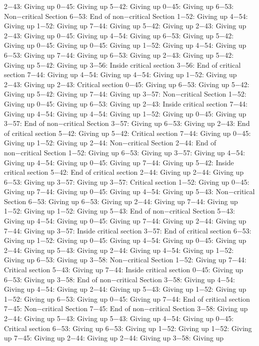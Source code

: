 2−43: Giving up
0−45: Giving up
5−42: Giving up
0−45: Giving up
6−53: Non−critical Section
6−53: End of non−critical Section
1−52: Giving up
4−54: Giving up
1−52: Giving up
7−44: Giving up
5−42: Giving up
2−43: Giving up
2−43: Giving up
0−45: Giving up
4−54: Giving up
6−53: Giving up
5−42: Giving up
0−45: Giving up
0−45: Giving up
1−52: Giving up
4−54: Giving up
6−53: Giving up
7−44: Giving up
6−53: Giving up
2−43: Giving up
5−42: Giving up
5−42: Giving up
3−56: Inside critical section
3−56: End of critical section
7−44: Giving up
4−54: Giving up
4−54: Giving up
1−52: Giving up
2−43: Giving up
2−43: Critical section
0−45: Giving up
6−53: Giving up
5−42: Giving up
5−42: Giving up
7−44: Giving up
3−57: Non−critical Section
1−52: Giving up
0−45: Giving up
6−53: Giving up
2−43: Inside critical section
7−44: Giving up
4−54: Giving up
4−54: Giving up
1−52: Giving up
0−45: Giving up
3−57: End of non−critical Section
3−57: Giving up
6−53: Giving up
2−43: End of critical section
5−42: Giving up
5−42: Critical section
7−44: Giving up
0−45: Giving up
1−52: Giving up
2−44: Non−critical Section
2−44: End of non−critical Section
1−52: Giving up
6−53: Giving up
3−57: Giving up
4−54: Giving up
4−54: Giving up
0−45: Giving up
7−44: Giving up
5−42: Inside critical section
5−42: End of critical section
2−44: Giving up
2−44: Giving up
6−53: Giving up
3−57: Giving up
3−57: Critical section
1−52: Giving up
0−45: Giving up
7−44: Giving up
0−45: Giving up
4−54: Giving up
5−43: Non−critical Section
6−53: Giving up
6−53: Giving up
2−44: Giving up
7−44: Giving up
1−52: Giving up
1−52: Giving up
5−43: End of non−critical Section
5−43: Giving up
4−54: Giving up
0−45: Giving up
7−44: Giving up
2−44: Giving up
7−44: Giving up
3−57: Inside critical section
3−57: End of critical section
6−53: Giving up
1−52: Giving up
0−45: Giving up
4−54: Giving up
0−45: Giving up
2−44: Giving up
5−43: Giving up
2−44: Giving up
4−54: Giving up
1−52: Giving up
6−53: Giving up
3−58: Non−critical Section
1−52: Giving up
7−44: Critical section
5−43: Giving up
7−44: Inside critical section
0−45: Giving up
6−53: Giving up
3−58: End of non−critical Section
3−58: Giving up
4−54: Giving up
4−54: Giving up
2−44: Giving up
5−43: Giving up
1−52: Giving up
1−52: Giving up
6−53: Giving up
0−45: Giving up
7−44: End of critical section
7−45: Non−critical Section
7−45: End of non−critical Section
3−58: Giving up
2−44: Giving up
5−43: Giving up
5−43: Giving up
4−54: Giving up
0−45: Critical section
6−53: Giving up
6−53: Giving up
1−52: Giving up
1−52: Giving up
7−45: Giving up
2−44: Giving up
2−44: Giving up
3−58: Giving up
